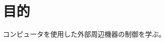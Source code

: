 \documentclass[../../../main]{subfiles}
\begin{document}
\section{目的}

コンピュータを使用した外部周辺機器の制御を学ぶ。
\end{document}
